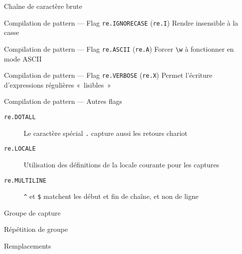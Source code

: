 \begin{frame}{Chaîne de caractère brute}
\end{frame}

\begin{frame}{Compilation de pattern --- Flag \texttt{re.IGNORECASE} (\texttt{re.I})}
  Rendre insensible à la casse
\end{frame}

\begin{frame}{Compilation de pattern --- Flag \texttt{re.ASCII} (\texttt{re.A})}
  Forcer \texttt{\textbackslash w} à fonctionner en mode ASCII
\end{frame}

\begin{frame}{Compilation de pattern --- Flag \texttt{re.VERBOSE} (\texttt{re.X})}
  Permet l'écriture d'expressions régulières «~lisibles~»
\end{frame}

\begin{frame}{Compilation de pattern --- Autres flags}
  \begin{description}
  \item[\texttt{re.DOTALL}] Le caractère spécial \texttt{.} capture aussi les retours chariot
  \item[\texttt{re.LOCALE}] Utilisation des définitions de la locale courante pour les captures
  \item[\texttt{re.MULTILINE}] \texttt{\^{}} et \texttt{\$} matchent les début et fin de chaîne, et non de ligne
  \end{description}
\end{frame}

\begin{frame}{Groupe de capture}
\end{frame}

\begin{frame}{Répétition de groupe}
\end{frame}

\begin{frame}{Remplacements}
\end{frame}

